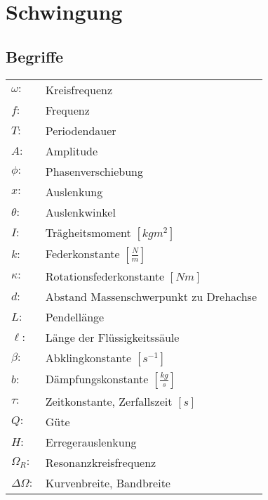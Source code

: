 



\chapter{Schwingung}
\section{Begriffe}
\begin{tabular}{ll}
$\omega:$       & Kreisfrequenz \\
$f:$            & Frequenz \\
$T:$            & Periodendauer \\
$A:$            & Amplitude \\
$\phi:$         & Phasenverschiebung \\
$x:$            & Auslenkung \\
$\theta:$       & Auslenkwinkel \\
$I:$            & Trägheitsmoment $[kg m^2]$ \\
$k:$            & Federkonstante $[\frac{N}{m}]$ \\
$\kappa:$       & Rotationsfederkonstante $[Nm]$ \\
$d:$            & Abstand Massenschwerpunkt zu Drehachse \\
$L:$            & Pendellänge \\
$\ell:$         & Länge der Flüssigkeitssäule \\
$\beta:$        & Abklingkonstante $[s^{-1}]$ \\
$b:$            & Dämpfungskonstante $[\frac{kg}{s}]$ \\
$\tau:$         & Zeitkonstante, Zerfallszeit $[s]$ \\
$Q:$            & Güte \\
$H:$            & Erregerauslenkung \\
$\Omega_R:$     & Resonanzkreisfrequenz \\
$\Delta\Omega:$ & Kurvenbreite, Bandbreite \\
\end{tabular}

